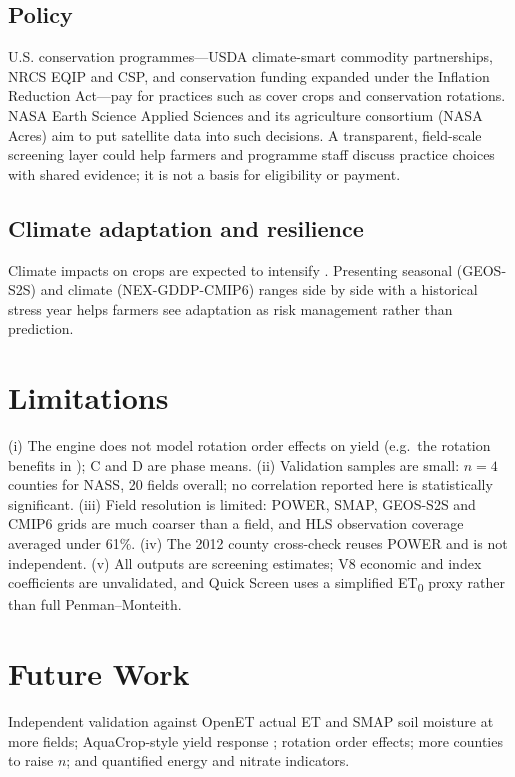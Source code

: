 \documentclass[10pt,twocolumn]{article}
\begin{document}
\subsection{Policy}
U.S. conservation programmes---USDA climate-smart commodity partnerships, NRCS EQIP and CSP, and conservation funding expanded under the Inflation Reduction Act---pay for practices such as cover crops and conservation rotations. NASA Earth Science Applied Sciences and its agriculture consortium (NASA Acres) aim to put satellite data into such decisions. A transparent, field-scale screening layer could help farmers and programme staff discuss practice choices with shared evidence; it is not a basis for eligibility or payment.

\subsection{Climate adaptation and resilience}
Climate impacts on crops are expected to intensify \citep{jagermeyr2021,rosenzweig2014,hatfield2011}. Presenting seasonal (GEOS-S2S) and climate (NEX-GDDP-CMIP6) ranges side by side with a historical stress year helps farmers see adaptation as risk management rather than prediction.

\section{Limitations}
(i) The engine does not model rotation order effects on yield (e.g.\ the rotation benefits in \citep{seifert2017,bowles2020}); C and D are phase means. (ii) Validation samples are small: $n=4$ counties for NASS, 20 fields overall; no correlation reported here is statistically significant. (iii) Field resolution is limited: POWER, SMAP, GEOS-S2S and CMIP6 grids are much coarser than a field, and HLS observation coverage averaged under 61\%. (iv) The 2012 county cross-check reuses POWER and is not independent. (v) All outputs are screening estimates; V8 economic and index coefficients are unvalidated, and Quick Screen uses a simplified ET\textsubscript{0} proxy rather than full Penman--Monteith.

\section{Future Work}
Independent validation against OpenET actual ET \citep{melton2022} and SMAP soil moisture at more fields; AquaCrop-style yield response \citep{steduto2009}; rotation order effects; more counties to raise $n$; and quantified energy and nitrate indicators.
\end{document}
